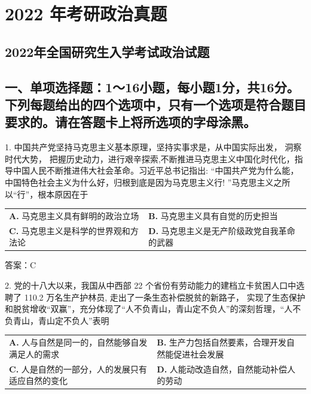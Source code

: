 \documentclass[UTF8,11pt]{ctexart}
\begin{document}
\section*{2022 年考研政治真题}
\subsection*{2022年全国研究生入学考试政治试题}

\subsection*{一、单项选择题：1～16小题，每小题1分，共16分。下列每题给出的四个选项中，只有一个选项是符合题目要求的。请在答题卡上将所选项的字母涂黑。}

1. 中国共产党坚持马克思主义基本原理，坚持实事求是，从中国实际出发， 洞察时代大势， 把握历史动力，进行艰辛探索,不断推进马克思主义中国化时代化，指导中国人民不断推进伟大社会革命。习近平总书记指出: “中国共产党为什么能，中国特色社会主义为什么好，归根到底是因为马克思主义行! ”马克思主义之所以“行”，根本原因在于


\begin{center}\begin{tabular}{>{\raggedright\arraybackslash}p{\dimexpr(\linewidth-4\tabcolsep)/2\relax}>{\raggedright\arraybackslash}p{\dimexpr(\linewidth-4\tabcolsep)/2\relax}}
\textbf{A.} 马克思主义具有鲜明的政治立场 & \textbf{B.} 马克思主义具有自觉的历史担当\\[.35em]
\textbf{C.} 马克思主义是科学的世界观和方法论 & \textbf{D.} 马克思主义是无产阶级政党自我革命的武器\\[.35em]\end{tabular}\end{center}

答案：C


2. 党的十八大以来，我国从中西部 22 个省份有劳动能力的建档立卡贫困人口中选聘了 110.2 万名生产护林员, 走出了一条生态补偿脱贫的新路子， 实现了生态保护和脱贫增收“双赢”，充分体现了“人不负青山，青山定不负人”的深刻哲理，“人不负青山，青山定不负人”表明


\begin{center}\begin{tabular}{>{\raggedright\arraybackslash}p{\dimexpr(\linewidth-4\tabcolsep)/2\relax}>{\raggedright\arraybackslash}p{\dimexpr(\linewidth-4\tabcolsep)/2\relax}}
\textbf{A.} 人与自然是同一的，自然能够自发满足人的需求 & \textbf{B.} 生产力包括自然要素，合理开发自然能促进社会发展\\[.35em]
\textbf{C.} 人是自然的一部分，人的发展只有适应自然的变化 & \textbf{D.} 人能动改造自然，自然能动补偿人的劳动\\[.35em]\end{tabular}\end{center}
\end{document}
